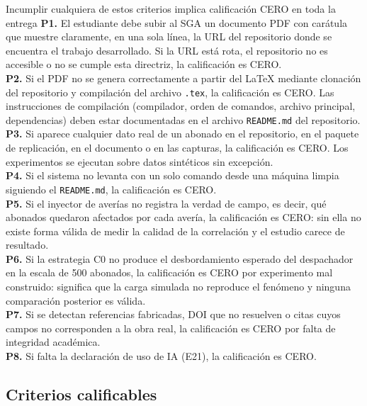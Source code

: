 \documentclass[11pt,a4paper]{article}
\begin{document}
\begin{alerta}{Incumplir cualquiera de estos criterios implica calificación CERO en toda la entrega}
	\textbf{P1.} El estudiante debe subir al SGA un documento PDF con carátula que muestre claramente, en una sola línea, la URL del repositorio donde se encuentra el trabajo desarrollado. Si la URL está rota, el repositorio no es accesible o no se cumple esta directriz, la calificación es CERO.\\[6pt]
	\textbf{P2.} Si el PDF no se genera correctamente a partir del LaTeX mediante clonación del repositorio y compilación del archivo \texttt{.tex}, la calificación es CERO. Las instrucciones de compilación (compilador, orden de comandos, archivo principal, dependencias) deben estar documentadas en el archivo \texttt{README.md} del repositorio.\\[6pt]
	\textbf{P3.} Si aparece cualquier dato real de un abonado en el repositorio, en el paquete de replicación, en el documento o en las capturas, la calificación es CERO. Los experimentos se ejecutan sobre datos sintéticos sin excepción.\\[6pt]
	\textbf{P4.} Si el sistema no levanta con un solo comando desde una máquina limpia siguiendo el \texttt{README.md}, la calificación es CERO.\\[6pt]
	\textbf{P5.} Si el inyector de averías no registra la verdad de campo, es decir, qué abonados quedaron afectados por cada avería, la calificación es CERO: sin ella no existe forma válida de medir la calidad de la correlación y el estudio carece de resultado.\\[6pt]
	\textbf{P6.} Si la estrategia C0 no produce el desbordamiento esperado del despachador en la escala de 500 abonados, la calificación es CERO por experimento mal construido: significa que la carga simulada no reproduce el fenómeno y ninguna comparación posterior es válida.\\[6pt]
	\textbf{P7.} Si se detectan referencias fabricadas, DOI que no resuelven o citas cuyos campos no corresponden a la obra real, la calificación es CERO por falta de integridad académica.\\[6pt]
	\textbf{P8.} Si falta la declaración de uso de IA (E21), la calificación es CERO.
\end{alerta}

\subsection{Criterios calificables}
\end{document}
